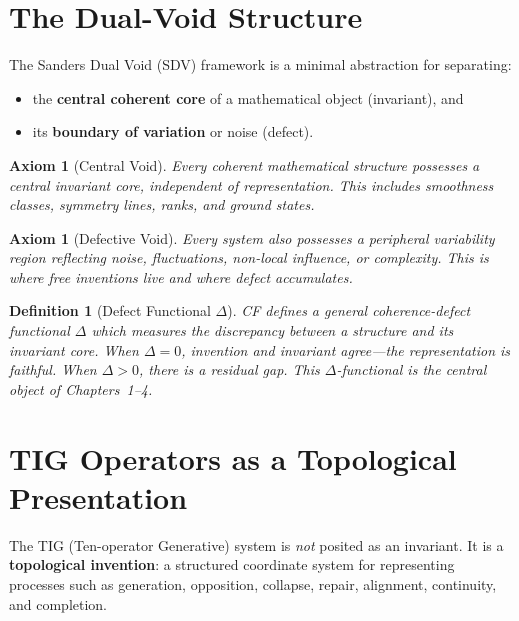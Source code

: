 \documentclass[12pt, openany]{book}
\newtheorem{definition}[theorem]{Definition}
\newtheorem{axiom}[theorem]{Axiom}
\theoremstyle{remark}
\begin{document}
\section{The Dual-Void Structure}
\label{sec:found-sdv}

The Sanders Dual Void (SDV) framework is a minimal abstraction for separating:
\begin{itemize}
  \item the \textbf{central coherent core} of a mathematical object (invariant), and
  \item its \textbf{boundary of variation} or noise (defect).
\end{itemize}

\begin{axiom}[Central Void]\label{ax:central-void}
Every coherent mathematical structure possesses a \emph{central invariant core},
independent of representation. This includes smoothness classes, symmetry lines, ranks,
and ground states.
\end{axiom}

\begin{axiom}[Defective Void]\label{ax:defective-void}
Every system also possesses a \emph{peripheral variability region} reflecting noise,
fluctuations, non-local influence, or complexity. This is where free inventions live
and where defect accumulates.
\end{axiom}

\begin{definition}[Defect Functional $\Delta$]\label{def:delta-foundations}
CF defines a general coherence-defect functional $\Delta$ which measures the discrepancy
between a structure and its invariant core. When $\Delta = 0$, invention and invariant
agree---the representation is faithful. When $\Delta > 0$, there is a residual gap.
This $\Delta$-functional is the central object of Chapters~1--4.
\end{definition}

\section{TIG Operators as a Topological Presentation}
\label{sec:found-tig}

The TIG (Ten-operator Generative) system is \emph{not} posited as an invariant.
It is a \textbf{topological invention}: a structured coordinate system for representing
processes such as generation, opposition, collapse, repair, alignment, continuity, and
completion.
\end{document}
